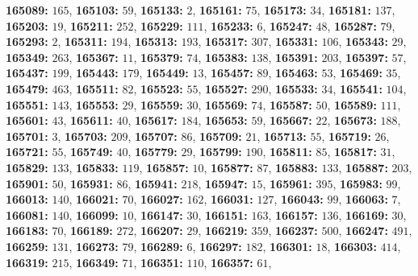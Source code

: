 \textsf{\bfseries 165089:} $165$, \textsf{\bfseries 165103:} $59$, \textsf{\bfseries 165133:} $2$, \textsf{\bfseries 165161:} $75$, \textsf{\bfseries 165173:} $34$, \textsf{\bfseries 165181:} $137$, \textsf{\bfseries 165203:} $19$, \textsf{\bfseries 165211:} $252$, \textsf{\bfseries 165229:} $111$, \textsf{\bfseries 165233:} $6$, \textsf{\bfseries 165247:} $48$, \textsf{\bfseries 165287:} $79$, \textsf{\bfseries 165293:} $2$, \textsf{\bfseries 165311:} $194$, \textsf{\bfseries 165313:} $193$, \textsf{\bfseries 165317:} $307$, \textsf{\bfseries 165331:} $106$, \textsf{\bfseries 165343:} $29$, \textsf{\bfseries 165349:} $263$, \textsf{\bfseries 165367:} $11$, \textsf{\bfseries 165379:} $74$, \textsf{\bfseries 165383:} $138$, \textsf{\bfseries 165391:} $203$, \textsf{\bfseries 165397:} $57$, \textsf{\bfseries 165437:} $199$, \textsf{\bfseries 165443:} $179$, \textsf{\bfseries 165449:} $13$, \textsf{\bfseries 165457:} $89$, \textsf{\bfseries 165463:} $53$, \textsf{\bfseries 165469:} $35$, \textsf{\bfseries 165479:} $463$, \textsf{\bfseries 165511:} $82$, \textsf{\bfseries 165523:} $55$, \textsf{\bfseries 165527:} $290$, \textsf{\bfseries 165533:} $34$, \textsf{\bfseries 165541:} $104$, \textsf{\bfseries 165551:} $143$, \textsf{\bfseries 165553:} $29$, \textsf{\bfseries 165559:} $30$, \textsf{\bfseries 165569:} $74$, \textsf{\bfseries 165587:} $50$, \textsf{\bfseries 165589:} $111$, \textsf{\bfseries 165601:} $43$, \textsf{\bfseries 165611:} $40$, \textsf{\bfseries 165617:} $184$, \textsf{\bfseries 165653:} $59$, \textsf{\bfseries 165667:} $22$, \textsf{\bfseries 165673:} $188$, \textsf{\bfseries 165701:} $3$, \textsf{\bfseries 165703:} $209$, \textsf{\bfseries 165707:} $86$, \textsf{\bfseries 165709:} $21$, \textsf{\bfseries 165713:} $55$, \textsf{\bfseries 165719:} $26$, \textsf{\bfseries 165721:} $55$, \textsf{\bfseries 165749:} $40$, \textsf{\bfseries 165779:} $29$, \textsf{\bfseries 165799:} $190$, \textsf{\bfseries 165811:} $85$, \textsf{\bfseries 165817:} $31$, \textsf{\bfseries 165829:} $133$, \textsf{\bfseries 165833:} $119$, \textsf{\bfseries 165857:} $10$, \textsf{\bfseries 165877:} $87$, \textsf{\bfseries 165883:} $133$, \textsf{\bfseries 165887:} $203$, \textsf{\bfseries 165901:} $50$, \textsf{\bfseries 165931:} $86$, \textsf{\bfseries 165941:} $218$, \textsf{\bfseries 165947:} $15$, \textsf{\bfseries 165961:} $395$, \textsf{\bfseries 165983:} $99$, \textsf{\bfseries 166013:} $140$, \textsf{\bfseries 166021:} $70$, \textsf{\bfseries 166027:} $162$, \textsf{\bfseries 166031:} $127$, \textsf{\bfseries 166043:} $99$, \textsf{\bfseries 166063:} $7$, \textsf{\bfseries 166081:} $140$, \textsf{\bfseries 166099:} $10$, \textsf{\bfseries 166147:} $30$, \textsf{\bfseries 166151:} $163$, \textsf{\bfseries 166157:} $136$, \textsf{\bfseries 166169:} $30$, \textsf{\bfseries 166183:} $70$, \textsf{\bfseries 166189:} $272$, \textsf{\bfseries 166207:} $29$, \textsf{\bfseries 166219:} $359$, \textsf{\bfseries 166237:} $500$, \textsf{\bfseries 166247:} $491$, \textsf{\bfseries 166259:} $131$, \textsf{\bfseries 166273:} $79$, \textsf{\bfseries 166289:} $6$, \textsf{\bfseries 166297:} $182$, \textsf{\bfseries 166301:} $18$, \textsf{\bfseries 166303:} $414$, \textsf{\bfseries 166319:} $215$, \textsf{\bfseries 166349:} $71$, \textsf{\bfseries 166351:} $110$, \textsf{\bfseries 166357:} $61$, 
